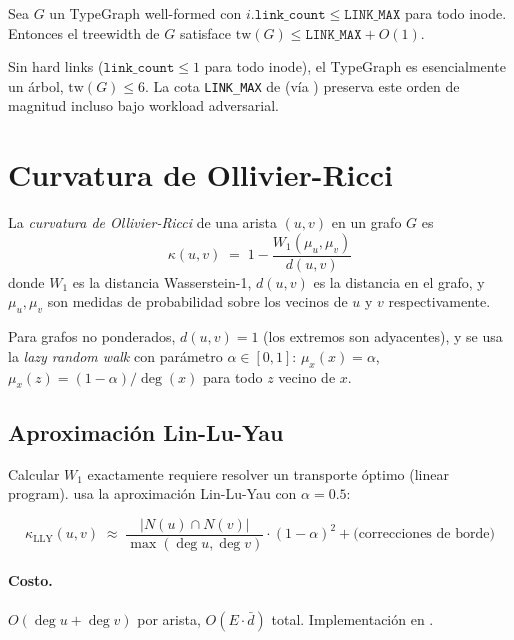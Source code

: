 \begin{teorema}
\label{teo:treewidth-fs}
Sea $G$ un TypeGraph well-formed con $i.\texttt{link\_count} \leq
\texttt{LINK\_MAX}$ para todo inode. Entonces el treewidth de $G$
satisface $\mathrm{tw}(G) \leq \texttt{LINK\_MAX} + O(1)$.
\end{teorema}

Sin hard links ($\texttt{link\_count} \leq 1$ para todo inode), el
TypeGraph es esencialmente un árbol, $\mathrm{tw}(G) \leq 6$. La cota
\texttt{LINK\_MAX} de  (vía
) preserva este orden de magnitud
incluso bajo workload adversarial.

\section{Curvatura de Ollivier-Ricci}

\begin{defn}
\label{def:ricci}
La \emph{curvatura de Ollivier-Ricci} de una arista $(u, v)$ en un
grafo $G$ es
\[
  \kappa(u, v) \;=\; 1 - \frac{W_1(\mu_u, \mu_v)}{d(u, v)}
\]
donde $W_1$ es la distancia Wasserstein-1, $d(u,v)$ es la distancia
en el grafo, y $\mu_u, \mu_v$ son medidas de probabilidad sobre los
vecinos de $u$ y $v$ respectivamente.
\end{defn}

Para grafos no ponderados, $d(u, v) = 1$ (los extremos son adyacentes),
y se usa la \emph{lazy random walk} con parámetro $\alpha \in [0, 1]$:
$\mu_x(x) = \alpha$, $\mu_x(z) = (1-\alpha)/\deg(x)$ para todo $z$
vecino de $x$.

\subsection*{Aproximación Lin-Lu-Yau}

Calcular $W_1$ exactamente requiere resolver un transporte óptimo
(linear program).  usa la aproximación
Lin-Lu-Yau \cite{LinLuYau2011} con $\alpha = 0.5$:

\[
  \kappa_{\mathrm{LLY}}(u, v) \;\approx\;
    \frac{|N(u) \cap N(v)|}{\max(\deg u, \deg v)}
    \cdot (1-\alpha)^2 + \text{(correcciones de borde)}
\]

\paragraph{Costo.} $O(\deg u + \deg v)$ por arista, $O(E \cdot \bar{d})$
total. Implementación en .

